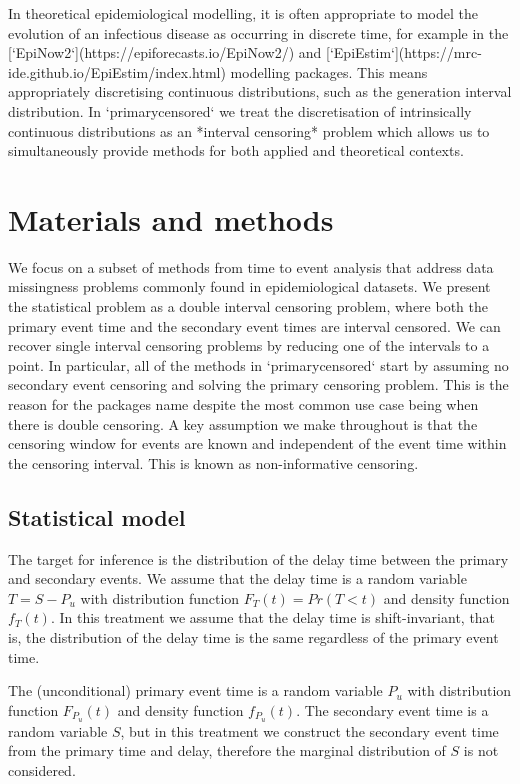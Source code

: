 \documentclass[10pt,letterpaper]{article}
\begin{document}
In theoretical epidemiological modelling, it is often appropriate to model the evolution of an infectious disease as occurring in discrete time, for example in the [`EpiNow2`](https://epiforecasts.io/EpiNow2/) and [`EpiEstim`](https://mrc-ide.github.io/EpiEstim/index.html) modelling packages. This means appropriately discretising continuous distributions, such as the generation interval distribution. In `primarycensored` we treat the discretisation of intrinsically continuous distributions as an *interval censoring* problem which allows us to simultaneously provide methods for both applied and theoretical contexts.

\section*{Materials and methods}


We focus on a subset of methods from time to event analysis that address data missingness problems commonly found in epidemiological datasets. We present the statistical problem as a double interval censoring problem, where both the primary event time and the secondary event times are interval censored. We can recover single interval censoring problems by reducing one of the intervals to a point. In particular, all of the methods in `primarycensored` start by assuming no secondary event censoring and solving the primary censoring problem. This is the reason for the packages name despite the most common use case being when there is double censoring. A key assumption we make throughout is that the censoring window for events are known and independent of the event time within the censoring interval. This is known as non-informative censoring.

\subsection*{Statistical model}
The target for inference is the distribution of the delay time between the primary and secondary events. We assume that the delay time is a random variable $T = S - P_{u}$ with distribution function $F_T(t) = Pr(T < t)$ and density function $f_T(t)$. In this treatment we assume that the delay time is shift-invariant, that is, the distribution of the delay time is the same regardless of the primary event time.

The (unconditional) primary event time is a random variable $P_{u}$ with distribution function $F_{P_{u}}(t)$ and density function $f_{P_{u}}(t)$. The secondary event time is a random variable $S$, but in this treatment we construct the secondary event time from the primary time and delay, therefore the marginal distribution of $S$ is not considered.
\end{document}
